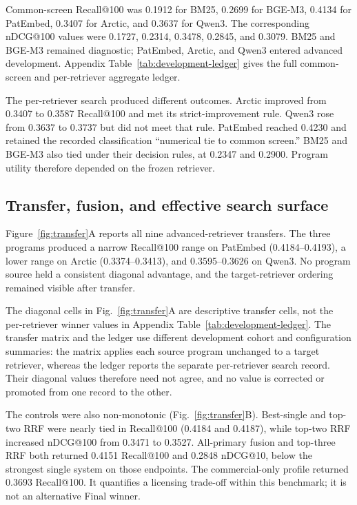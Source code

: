 \documentclass[final,5p,times,twocolumn]{elsarticle}
\begin{document}
Common-screen Recall@100 was 0.1912 for BM25, 0.2699 for BGE-M3, 0.4134 for
PatEmbed, 0.3407 for Arctic, and 0.3637 for Qwen3. The corresponding nDCG@100
values were 0.1727, 0.2314, 0.3478, 0.2845, and 0.3079. BM25 and BGE-M3
remained diagnostic; PatEmbed, Arctic, and Qwen3 entered advanced development.
Appendix Table~\ref{tab:development-ledger} gives the full common-screen and
per-retriever aggregate ledger.

The per-retriever search produced different outcomes. Arctic improved from
0.3407 to 0.3587 Recall@100 and met its strict-improvement rule. Qwen3 rose
from 0.3637 to 0.3737 but did not meet that rule. PatEmbed reached 0.4230 and
retained the recorded classification ``numerical tie to common screen.'' BM25
and BGE-M3 also tied under their decision rules, at 0.2347 and 0.2900. Program
utility therefore depended on the frozen retriever.

\subsection{Transfer, fusion, and effective search surface}

Figure~\ref{fig:transfer}A reports all nine advanced-retriever transfers. The
three programs produced a narrow Recall@100 range on PatEmbed
(0.4184--0.4193), a lower range on Arctic (0.3374--0.3413), and
0.3595--0.3626 on Qwen3. No
program source held a consistent diagonal advantage, and the target-retriever
ordering remained visible after transfer.

The diagonal cells in Fig.~\ref{fig:transfer}A are descriptive transfer cells,
not the per-retriever winner values in Appendix Table~\ref{tab:development-ledger}.
The transfer matrix and the ledger use different development cohort and
configuration summaries: the matrix applies each source program unchanged to a
target retriever, whereas the ledger reports the separate per-retriever search
record. Their diagonal values therefore need not agree, and no value is
corrected or promoted from one record to the other.

The controls were also non-monotonic (Fig.~\ref{fig:transfer}B). Best-single
and top-two RRF were nearly tied in Recall@100 (0.4184 and 0.4187), while
top-two RRF increased nDCG@100 from 0.3471 to 0.3527. All-primary fusion and
top-three RRF both returned 0.4151 Recall@100 and 0.2848 nDCG@10, below the
strongest single system on those endpoints. The commercial-only profile
returned 0.3693 Recall@100. It quantifies a licensing trade-off within this
benchmark; it is not an alternative Final winner.
\end{document}
